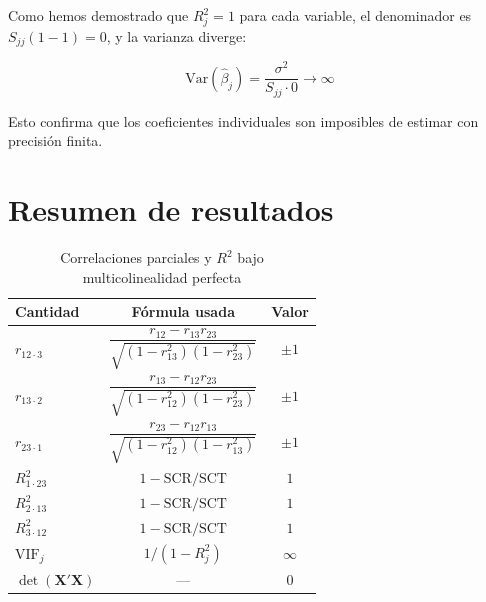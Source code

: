 \documentclass[12pt, letterpaper]{article}
\theoremstyle{remark}
\newcommand{\rp}[2]{r_{#1 \cdot #2}}   %
\newcommand{\Rd}[2]{R^2_{#1 \cdot #2}} %
\begin{document}
\noindent Como hemos demostrado que $R_j^2 = 1$ para cada variable, el denominador
es $S_{jj}(1 - 1) = 0$, y la varianza diverge:

\begin{equation}
  \text{Var}(\hat\beta_j)
    = \frac{\sigma^2}{S_{jj} \cdot 0}
    \to \infty
  \label{eq:var_inf}
\end{equation}

\noindent Esto confirma que los coeficientes individuales son imposibles de estimar
con precisión finita.

\section{Resumen de resultados}

\begin{table}[ht]
\centering
\caption{Correlaciones parciales y $R^2$ bajo multicolinealidad perfecta}
\label{tab:resumen}
\small
\begin{tabular}{lcc}
\toprule
\textbf{Cantidad} & \textbf{Fórmula usada} & \textbf{Valor} \\
\midrule
$\rp{12}{3}$ & $\dfrac{r_{12}-r_{13}r_{23}}{\sqrt{(1-r_{13}^2)(1-r_{23}^2)}}$ & $\pm 1$ \\[10pt]
$\rp{13}{2}$ & $\dfrac{r_{13}-r_{12}r_{23}}{\sqrt{(1-r_{12}^2)(1-r_{23}^2)}}$ & $\pm 1$ \\[10pt]
$\rp{23}{1}$ & $\dfrac{r_{23}-r_{12}r_{13}}{\sqrt{(1-r_{12}^2)(1-r_{13}^2)}}$ & $\pm 1$ \\[10pt]
\midrule
$\Rd{1}{23}$ & $1 - \text{SCR}/\text{SCT}$ & $1$ \\[4pt]
$\Rd{2}{13}$ & $1 - \text{SCR}/\text{SCT}$ & $1$ \\[4pt]
$\Rd{3}{12}$ & $1 - \text{SCR}/\text{SCT}$ & $1$ \\
\midrule
$\text{VIF}_j$ & $1/(1-R_j^2)$ & $\infty$ \\
$\det(\mathbf{X'X})$ & --- & $0$ \\
\bottomrule
\end{tabular}
\end{table}
\end{document}
